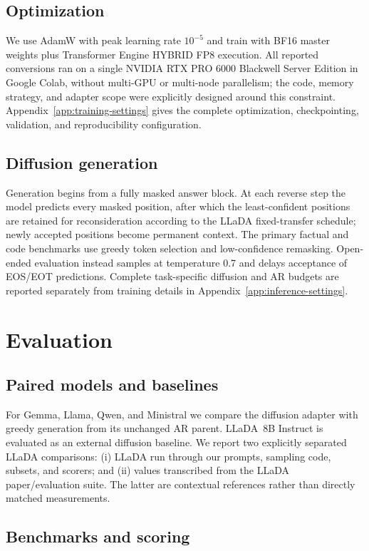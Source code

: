 \documentclass{article}
\begin{document}
\subsection{Optimization}

We use AdamW with peak learning rate $10^{-5}$ and train with BF16 master weights plus Transformer Engine HYBRID FP8 execution. All reported conversions ran on a single NVIDIA RTX PRO 6000 Blackwell Server Edition in Google Colab, without multi-GPU or multi-node parallelism; the code, memory strategy, and adapter scope were explicitly designed around this constraint. Appendix~\ref{app:training-settings} gives the complete optimization, checkpointing, validation, and reproducibility configuration.

\subsection{Diffusion generation}

Generation begins from a fully masked answer block. At each reverse step the model predicts every masked position, after which the least-confident positions are retained for reconsideration according to the LLaDA fixed-transfer schedule; newly accepted positions become permanent context. The primary factual and code benchmarks use greedy token selection and low-confidence remasking. Open-ended evaluation instead samples at temperature 0.7 and delays acceptance of EOS/EOT predictions. Complete task-specific diffusion and AR budgets are reported separately from training details in Appendix~\ref{app:inference-settings}.

\section{Evaluation}
\subsection{Paired models and baselines}
For Gemma, Llama, Qwen, and Ministral we compare the diffusion adapter with greedy generation from its unchanged AR parent. LLaDA~8B Instruct is evaluated as an external diffusion baseline. We report two explicitly separated LLaDA comparisons: (i) LLaDA run through our prompts, sampling code, subsets, and scorers; and (ii) values transcribed from the LLaDA paper/evaluation suite. The latter are contextual references rather than directly matched measurements.

\subsection{Benchmarks and scoring}
\end{document}
